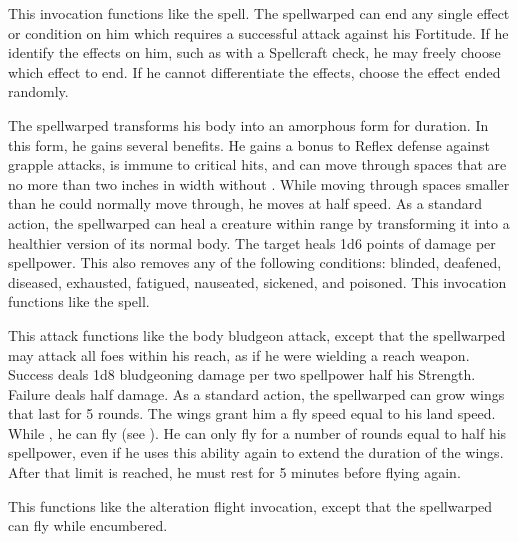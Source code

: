             This invocation functions like the  spell.
            The spellwarped can end any single effect or condition on him which requires a successful attack against his Fortitude.
            If he identify the effects on him, such as with a Spellcraft check, he may freely choose which effect to end.
            If he cannot differentiate the effects, choose the effect ended randomly.

            The spellwarped transforms his body into an amorphous form for \durshort duration.
            In this form, he gains several benefits.
            He gains a  bonus to Reflex defense against grapple attacks, is immune to critical hits, and can move through spaces that are no more than two inches in width without .
            While moving through spaces smaller than he could normally move through, he moves at half speed.
            As a standard action, the spellwarped can heal a creature within \rngclose range by transforming it into a healthier version of its normal body.
            The target heals 1d6 points of damage per spellpower.
            This also removes any of the following conditions: blinded, deafened, diseased, exhausted, fatigued, nauseated, sickened, and poisoned.
            This invocation functions like the  spell.

            This attack functions like the body bludgeon attack, except that the spellwarped may attack all foes within his reach, as if he were wielding a reach weapon.
            Success deals 1d8 bludgeoning damage per two spellpower \add half his Strength.
            Failure deals half damage.
            As a standard action, the spellwarped can grow wings that last for 5 rounds.
            The wings grant him a fly speed equal to his land speed.
            While \unencumbered, he can fly (see ).
            He can only fly for a number of rounds equal to half his spellpower, even if he uses this ability again to extend the duration of the wings.
            After that limit is reached, he must rest for 5 minutes before flying again.

            This functions like the alteration flight invocation, except that the spellwarped can fly while encumbered.

